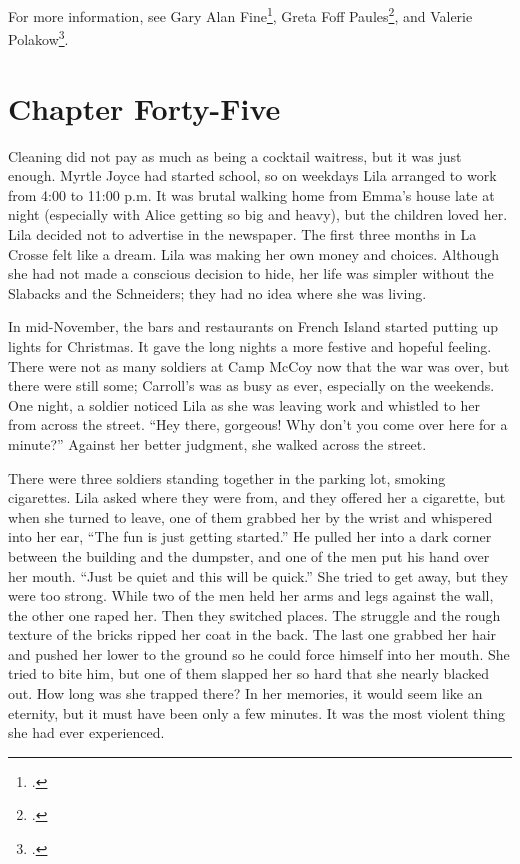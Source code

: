 \documentclass[
  letterpaper,
]{book}
\begin{document}
For more information, see Gary Alan Fine\footnote{.}, Greta Foff Paules\footnote{.}, and
Valerie Polakow\footnote{.}.


\chapter{Chapter Forty-Five}\label{chapter-forty-five}

Cleaning did not pay as much as being a cocktail waitress, but it was
just enough. Myrtle Joyce had started school, so on weekdays Lila
arranged to work from 4:00 to 11:00 p.m. It was brutal walking home from
Emma's house late at night (especially with Alice getting so big and
heavy), but the children loved her. Lila decided not to advertise in the
newspaper. The first three months in La Crosse felt like a dream. Lila
was making her own money and choices. Although she had not made a
conscious decision to hide, her life was simpler without the Slabacks
and the Schneiders; they had no idea where she was living.

In mid-November, the bars and restaurants on French Island started
putting up lights for Christmas. It gave the long nights a more festive
and hopeful feeling. There were not as many soldiers at Camp McCoy now
that the war was over, but there were still some; Carroll's was as busy
as ever, especially on the weekends. One night, a soldier noticed Lila
as she was leaving work and whistled to her from across the street.
``Hey there, gorgeous! Why don't you come over here for a minute?''
Against her better judgment, she walked across the street.

There were three soldiers standing together in the parking lot, smoking
cigarettes. Lila asked where they were from, and they offered her a
cigarette, but when she turned to leave, one of them grabbed her by the
wrist and whispered into her ear, ``The fun is just getting started.''
He pulled her into a dark corner between the building and the dumpster,
and one of the men put his hand over her mouth. ``Just be quiet and this
will be quick.'' She tried to get away, but they were too strong. While
two of the men held her arms and legs against the wall, the other one
raped her. Then they switched places. The struggle and the rough texture
of the bricks ripped her coat in the back. The last one grabbed her hair
and pushed her lower to the ground so he could force himself into her
mouth. She tried to bite him, but one of them slapped her so hard that
she nearly blacked out. How long was she trapped there? In her memories,
it would seem like an eternity, but it must have been only a few
minutes. It was the most violent thing she had ever experienced.
\end{document}
